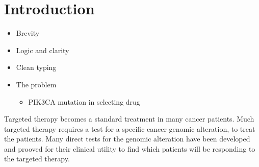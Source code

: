 \documentclass[10pt,letterpaper]{article}
\newcommand{\getIndex}[2]{
  \ForEach{,}{\IfEq{#1}{\thislevelitem}{\number\thislevelcount\ExitForEach}{}}{#2}
}
\newcommand{\getAff}[1]{
  \getIndex{#1}{}
}
\providecommand{\tightlist}{%
  \setlength{\itemsep}{0pt}\setlength{\parskip}{0pt}}
\begin{document}
\vspace*{0.2in}



\linenumbers

\hypertarget{introduction}{%
\section{Introduction}\label{introduction}}

\begin{itemize}
\item
  Brevity
\item
  Logic and clarity
\item
  Clean typing
\item
  The problem

  \begin{itemize}
  \tightlist
  \item
    PIK3CA mutation in selecting drug
  \end{itemize}
\end{itemize}

Targeted therapy becomes a standard treatment in many cancer patients.
Much targeted therapy requires a test for a specific cancer genomic
alteration, to treat the patients. Many direct tests for the genomic
alteration have been developed and prooved for their clinical utility to
find which patients will be responding to the targeted therapy.
\end{document}
